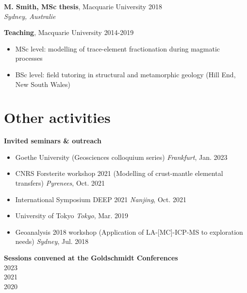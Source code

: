 \documentclass[a4paper,11pt]{article}
\begin{document}
    \textbf{M. Smith, MSc thesis}, Macquarie University
    \hfill {2018}\\ 
    \hfill \textit{Sydney, Australie}

\textbf{Teaching}, Macquarie University
\hfill {2014-2019}
    \begin{itemize}[label={},itemsep=0pt,parsep=0pt]
        \item MSc level: modelling of trace-element fractionation during magmatic processes 
        \item BSc level: field tutoring in structural and metamorphic geology (Hill End, New South Wales)
    \end{itemize}

\section{Other activities}

    \textbf{Invited seminars \& outreach}
    \begin{itemize}[label={},itemsep=0pt,parsep=0pt]
        \item Goethe University (Geosciences colloquium series)
            \hfill \textit{Frankfurt}, {Jan. 2023}
        \item CNRS Forsterite workshop 2021 (Modelling of crust-mantle elemental transfers)
            \hfill \textit{Pyrenees}, {Oct. 2021}
        \item International Symposium DEEP 2021
            \hfill \textit{Nanjing}, {Oct. 2021}
        \item University of Tokyo
            \hfill \textit{Tokyo}, {Mar. 2019}
        \item Geoanalysis 2018 workshop (Application of LA-[MC]-ICP-MS to exploration needs)
            \hfill \textit{Sydney}, {Jul. 2018}
    \end{itemize}

    \textbf{Sessions convened at the Goldschmidt Conferences}\\
     \hfill {2023}\\
     \hfill {2021} \\
     \hfill {2020}
    
\end{document}

